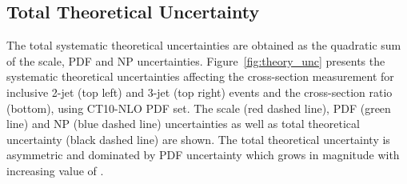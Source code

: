 \subsection{Total Theoretical Uncertainty}
The total systematic theoretical uncertainties are obtained as the quadratic sum of the scale, PDF and NP uncertainties. Figure~\ref{fig:theory_unc} presents the systematic theoretical uncertainties affecting the cross-section measurement for inclusive 2-jet (top left) and 3-jet (top right) events and the cross-section ratio \ratio (bottom), using CT10-NLO PDF set. The scale (red dashed line), PDF (green line) and NP (blue dashed line) uncertainties as well as total theoretical uncertainty (black dashed line) are shown. The total theoretical uncertainty is asymmetric and dominated by PDF uncertainty which grows in magnitude with increasing value of \httwo.
